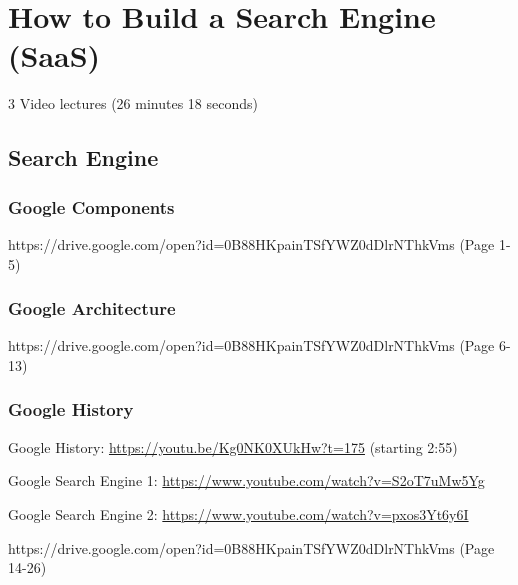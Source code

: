 \part{How to Build a Search Engine
(SaaS)}

  3 Video lectures (26 minutes 18 seconds)

\chapter{Search Engine}

\section{Google Components}


{https://drive.google.com/open?id=0B88HKpainTSfYWZ0dDlrNThkVms
  (Page 1-5)}

\section{Google Architecture}


{https://drive.google.com/open?id=0B88HKpainTSfYWZ0dDlrNThkVms
  (Page 6-13)}

\section{Google History}

  Google History: \url{https://youtu.be/Kg0NK0XUkHw?t=175}  (starting 2:55)

  Google Search Engine 1: \url{https://www.youtube.com/watch?v=S2oT7uMw5Yg}

  Google Search Engine 2: \url{https://www.youtube.com/watch?v=pxos3Yt6y6I}



{https://drive.google.com/open?id=0B88HKpainTSfYWZ0dDlrNThkVms
  (Page 14-26)}

